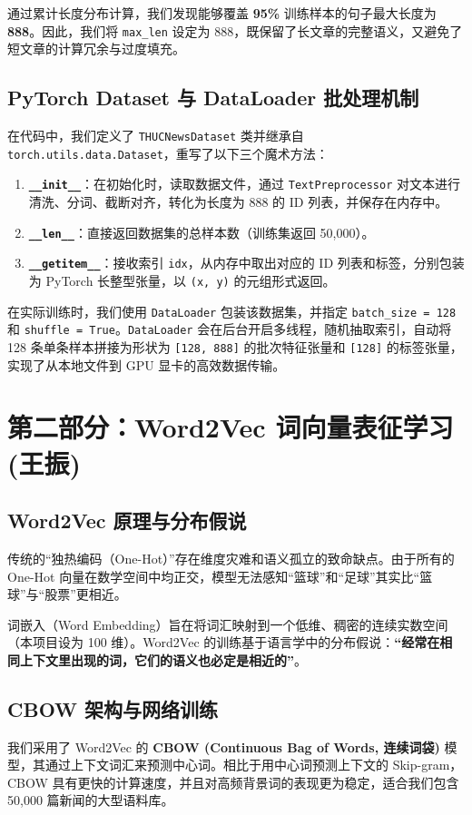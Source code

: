 \documentclass[UTF8,a4paper,11pt]{ctexart}
\begin{document}
通过累计长度分布计算，我们发现能够覆盖 \textbf{95\%} 训练样本的句子最大长度为 \textbf{888}。因此，我们将 \texttt{max\_len} 设定为 888，既保留了长文章的完整语义，又避免了短文章的计算冗余与过度填充。

\subsection{PyTorch Dataset 与 DataLoader 批处理机制}
在代码中，我们定义了 \texttt{THUCNewsDataset} 类并继承自 \texttt{torch.utils.data.Dataset}，重写了以下三个魔术方法：
\begin{enumerate}
    \item \textbf{\texttt{\_\_init\_\_}}：在初始化时，读取数据文件，通过 \texttt{TextPreprocessor} 对文本进行清洗、分词、截断对齐，转化为长度为 888 的 ID 列表，并保存在内存中。
    \item \textbf{\texttt{\_\_len\_\_}}：直接返回数据集的总样本数（训练集返回 50,000）。
    \item \textbf{\texttt{\_\_getitem\_\_}}：接收索引 \texttt{idx}，从内存中取出对应的 ID 列表和标签，分别包装为 PyTorch 长整型张量，以 \texttt{(x, y)} 的元组形式返回。
\end{enumerate}

在实际训练时，我们使用 \texttt{DataLoader} 包装该数据集，并指定 \texttt{batch\_size = 128} 和 \texttt{shuffle = True}。\texttt{DataLoader} 会在后台开启多线程，随机抽取索引，自动将 128 条单条样本拼接为形状为 \texttt{[128, 888]} 的批次特征张量和 \texttt{[128]} 的标签张量，实现了从本地文件到 GPU 显卡的高效数据传输。

\section{第二部分：Word2Vec 词向量表征学习 (王振)}

\subsection{Word2Vec 原理与分布假说}
传统的“独热编码（One-Hot）”存在维度灾难和语义孤立的致命缺点。由于所有的 One-Hot 向量在数学空间中均正交，模型无法感知“篮球”和“足球”其实比“篮球”与“股票”更相近。

词嵌入（Word Embedding）旨在将词汇映射到一个低维、稠密的连续实数空间（本项目设为 100 维）。Word2Vec 的训练基于语言学中的分布假说：\textbf{“经常在相同上下文里出现的词，它们的语义也必定是相近的”}。

\subsection{CBOW 架构与网络训练}
我们采用了 Word2Vec 的 \textbf{CBOW (Continuous Bag of Words, 连续词袋)} 模型，其通过上下文词汇来预测中心词。相比于用中心词预测上下文的 Skip-gram，CBOW 具有更快的计算速度，并且对高频背景词的表现更为稳定，适合我们包含 50,000 篇新闻的大型语料库。
\end{document}
